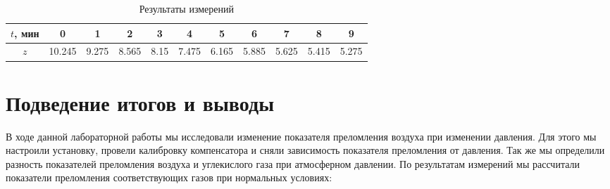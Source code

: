 \documentclass[a4paper,12pt]{article} %
\begin{document}
\begin{table}[h]
    \centering
        \begin{tabular}{|c|*{10}{c|}}
        \hline
        $t$, мин & 0 & 1 & 2 & 3 & 4 & 5 & 6 & 7 & 8 & 9 \\ \hline
        $z$ & 10.245 & 9.275 & 8.565 & 8.15 & 7.475 & 6.165 & 5.885 & 5.625 & 5.415 & 5.275 \\ \hline
    \end{tabular}
    \caption{Результаты измерений}
    \label{tab3}
\end{table}

\section{Подведение итогов и выводы}

В ходе данной лабораторной работы мы исследовали изменение показателя преломления воздуха при изменении давления. Для этого мы настроили установку, провели калибровку компенсатора и сняли зависимость показателя преломления от давления. Так же мы определили разность показателей преломления воздуха и углекислого газа при атмосферном давлении. По результатам измерений мы рассчитали показатели преломления соответствующих газов при нормальных условиях:

\begin{center}
\end{center}

\begin{center}
\end{center}
\end{document}
